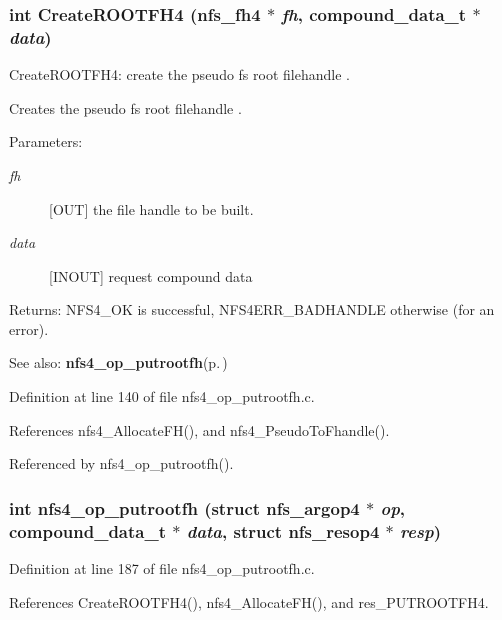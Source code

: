 \subsubsection{\setlength{\rightskip}{0pt plus 5cm}int Create\-ROOTFH4 (nfs\_\-fh4 $\ast$ {\em fh}, compound\_\-data\_\-t $\ast$ {\em data})}\label{nfs4__op__putrootfh_8c_a2}


Create\-ROOTFH4: create the pseudo fs root filehandle .

Creates the pseudo fs root filehandle .

\begin{Desc}
\item[Parameters:]
\begin{description}
\item[{\em fh}][OUT] the file handle to be built. \item[{\em data}][INOUT] request compound data\end{description}
\end{Desc}
\begin{Desc}
\item[Returns:]NFS4\_\-OK is successful, NFS4ERR\_\-BADHANDLE otherwise (for an error).\end{Desc}
\begin{Desc}
\item[See also:]{\bf nfs4\_\-op\_\-putrootfh}{\rm (p.\,\pageref{nfs4__op__putrootfh_8c_a3})} \end{Desc}


Definition at line 140 of file nfs4\_\-op\_\-putrootfh.c.

References nfs4\_\-Allocate\-FH(), and nfs4\_\-Pseudo\-To\-Fhandle().

Referenced by nfs4\_\-op\_\-putrootfh().
\subsubsection{\setlength{\rightskip}{0pt plus 5cm}int nfs4\_\-op\_\-putrootfh (struct nfs\_\-argop4 $\ast$ {\em op}, compound\_\-data\_\-t $\ast$ {\em data}, struct nfs\_\-resop4 $\ast$ {\em resp})}\label{nfs4__op__putrootfh_8c_a3}




Definition at line 187 of file nfs4\_\-op\_\-putrootfh.c.

References Create\-ROOTFH4(), nfs4\_\-Allocate\-FH(), and res\_\-PUTROOTFH4.
